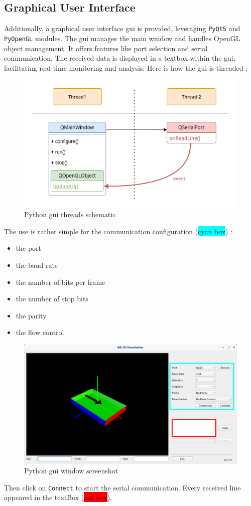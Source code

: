\subsection{Graphical User Interface}
Additionally, a graphical user interface \gls{gui} is provided, leveraging \texttt{PyQt5}\cite{pyqt5} and \texttt{PyOpenGL}\cite{pyopengl} modules. The \gls{gui} manages the main window and handles OpenGL object management. It offers features like port selection and serial communication. The received data is displayed in a textbox within the \gls{gui}, facilitating real-time monitoring and analysis.
Here is how the \gls{gui} is threaded :
\begin{figure}[H]
    \centering
    \includegraphics[width=0.65\linewidth]{./projects/pmodnav/gui_threads.png}
    \caption{Python \gls{gui} threads schematic}
\end{figure}
The use is rather simple for the communication configuration (\colorbox{cyan}{cyan box}) :
\begin{itemize}
    \item the port
    \item the baud rate
    \item the number of bits per frame
    \item the number of stop bits
    \item the parity
    \item the flow control
\end{itemize}
\begin{figure}[H]
    \centering
    \includegraphics[width=0.65\linewidth]{./projects/pmodnav/gui_window.png}
    \caption{Python \gls{gui} window screenshot}
\end{figure}
Then click on \texttt{Connect} to start the serial communication. Every received line appeared in the textBox (\colorbox{red}{red box}).

